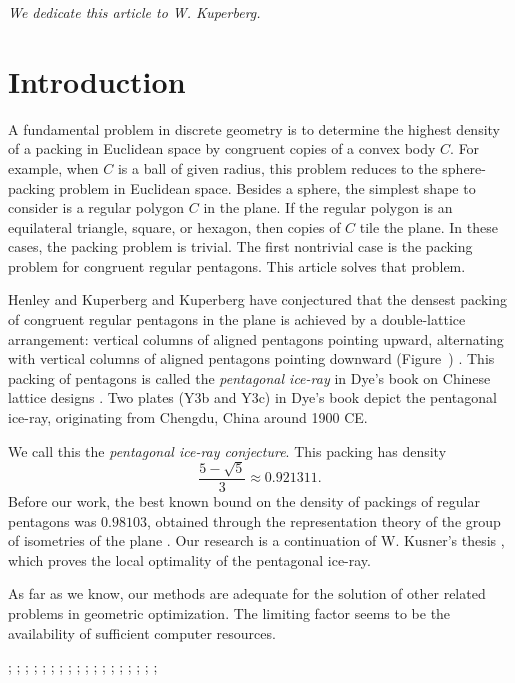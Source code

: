 \centerline{\it We dedicate this article to W. Kuperberg.}

\section{Introduction} 

A fundamental problem in discrete geometry is to determine the highest
density of a packing in Euclidean space by congruent copies of a
convex body $C$.  For example, when $C$ is a ball of given radius,
this problem reduces to the sphere-packing problem in Euclidean space.
Besides a sphere, the simplest shape to consider is a regular polygon
$C$ in the plane.  If the regular polygon is an equilateral
triangle, square, or hexagon, then copies of $C$ tile the plane.  In
these cases, the packing problem is trivial.  The first nontrivial
case is the packing problem for congruent regular pentagons.  This
article solves that problem.

Henley and Kuperberg and Kuperberg have conjectured that the densest
packing of congruent regular pentagons in the plane is achieved by a
double-lattice arrangement: vertical columns of aligned pentagons
pointing upward, alternating with vertical columns of aligned
pentagons pointing downward (Figure~)
\cite{Kup} \cite[p.801]{henley}.  This packing of pentagons is called
the {\it pentagonal ice-ray} in Dye's book on Chinese lattice designs
\cite{dye}.  Two plates (Y3b and Y3c) in Dye's book depict the
pentagonal ice-ray, originating from Chengdu, China around 1900 CE.

We call this the {\it pentagonal ice-ray  conjecture}.
This packing has density
\[
\frac{5 - \sqrt{5}}3 \approx 0.921311.
\] %
Before our work, the best known bound on the density of packings of
regular pentagons was $0.98103$, obtained through the representation
theory of the group of isometries of the plane \cite{Val}.  Our
research is a continuation of W. Kusner's thesis \cite{Kus}, which
proves the local optimality of the pentagonal ice-ray.

As far as we know, our methods are adequate for the solution of other
related problems in geometric optimization.  The limiting factor seems
to be the availability of sufficient computer resources.

{
;  %
;  %
;  
;  %
; 
;  
;  
;  %
; 
;  
;  
;  %
;  %
; 
;  %
; 
;  
;   
}

